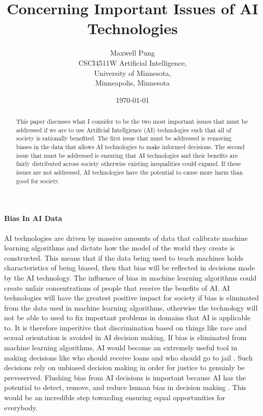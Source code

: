 \documentclass[12pt]{article}
\begin{document}
\title{Concerning Important Issues of AI Technologies}
\author{Maxwell Pung\\
	CSCI4511W Artificial Intelligence,\\
	University of Minnesota,\\
	Minneapolis, Minnesota}
\date{\today}
\maketitle

\newpage

\begin{abstract}
This paper discusses what I consider to be the two most important issues that must be addressed if we are to use Artificial Intellgience (AI) technologies such that all of society is rationally benefited. The first issue that must be addressed is removing biases in the data that allows AI technologies to make informed decisions. The second issue that must be addressed is ensuring that AI technologies and their benefits are fairly distributed across society otherwise existing inequalities could expand. If these issues are not addressed, AI technologies have the potential to cause more harm than good for society. 
\end{abstract}

\paragraph{Bias In AI Data\\}
AI technologies are driven by massive amounts of data that calibrate machine learning algorithms and dictate how the model of the world they create is constructed. This means that if the data being used to teach machines holds characteristics of being biased, then that bias will be reflected in decisions made by the AI technology. The influence of bias in machine learning algorithms could create unfair concentrations of people that receive the benefits of AI. AI technologies will have the greatest positive impact for society if bias is eliminated from the data used in machine learning algorithms, otherwise the technology will not be able to used to fix important problems in domains that AI is applicable to. It is therefore imperitive that discrimination based on things like race and sexual orientation is avoided in AI decision making. If bias is eliminated from machine learning algorithms, AI would become an extremely useful tool in making decisions like who should receive loans and who should go to jail \cite[pg. 43]{twentythirty}. Such decisions rely on unbiased decision making in order for justice to genuinly be preveserved. Flushing bias from AI decisions is important because AI has the potential to detect, remove, and reduce human bias in decision making \cite[pg. 37]{twentythirty}. This would be an incredible step towarding ensuring equal opportunities for everybody. 
\end{document}
